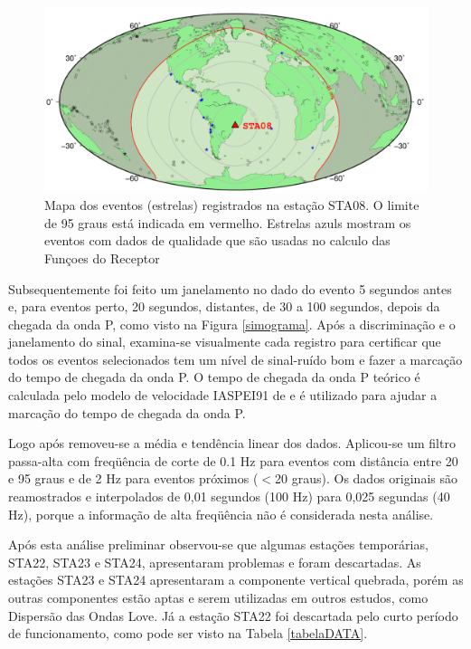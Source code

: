 \begin{figure}[!ht]
\centering
\includegraphics[scale=0.5]{Figs/mapa_de_eventos.png}
\caption[Mapa dos eventos registrados na estação STA08.]{Mapa dos eventos (estrelas) registrados na estação STA08. O limite de 95 graus está indicada em vermelho. Estrelas azuls mostram os eventos com dados de qualidade que são usadas no calculo das Funçoes do Receptor}
\label{mapa_eventos}
\end{figure}

Subsequentemente foi feito um janelamento no dado do evento 5 segundos antes e, para eventos perto, 20 segundos, distantes, de 30 a 100 segundos, depois da chegada da onda P, como visto na Figura \ref{simograma}. Após a discriminação e o janelamento do sinal, examina-se visualmente cada registro para certificar que todos os eventos selecionados tem um nível de sinal-ruído bom e fazer a marcação do tempo de chegada da onda P. O tempo de chegada da onda P teórico é calculada pelo modelo de velocidade IASPEI91 de \cite{kennet_iaspei_1991} e é utilizado para ajudar a marcação do tempo de chegada da onda P.

Logo após removeu-se a média e tendência linear dos dados. Aplicou-se um filtro passa-alta com freqüência de corte de 0.1 Hz para eventos com distância entre 20 e 95 graus e de 2 Hz para eventos próximos ($<$20 graus). Os dados originais são reamostrados e interpolados de 0,01 segundos (100 Hz) para 0,025 segundas (40 Hz), porque a informação de alta freqüência não é considerada nesta análise.

Após esta análise preliminar observou-se que algumas estações temporárias, STA22, STA23 e STA24, apresentaram problemas e foram descartadas. As estações STA23 e STA24 apresentaram a componente vertical quebrada, porém as outras componentes estão aptas e serem utilizadas em outros estudos, como Dispersão das Ondas Love. Já a estação STA22 foi descartada pelo curto período de funcionamento, como pode ser visto na Tabela \ref{tabelaDATA}.



